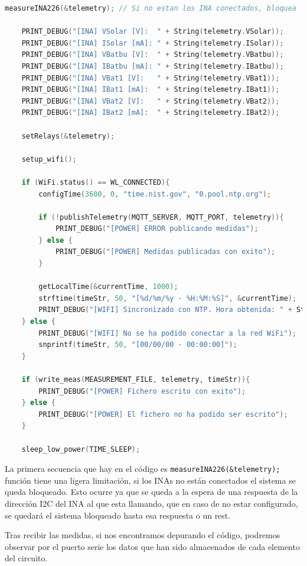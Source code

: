 \begin{lstlisting}[captionpos=b, caption={Codigo de la funcion loop}, language=c++]
    measureINA226(&telemetry); // Si no estan los INA conectados, bloquea

    PRINT_DEBUG("[INA] VSolar [V]:  " + String(telemetry.VSolar));
    PRINT_DEBUG("[INA] ISolar [mA]: " + String(telemetry.ISolar));
    PRINT_DEBUG("[INA] VBatbu [V]:  " + String(telemetry.VBatbu));
    PRINT_DEBUG("[INA] IBatbu [mA]: " + String(telemetry.IBatbu));
    PRINT_DEBUG("[INA] VBat1 [V]:   " + String(telemetry.VBat1));
    PRINT_DEBUG("[INA] IBat1 [mA]:  " + String(telemetry.IBat1));
    PRINT_DEBUG("[INA] VBat2 [V]:   " + String(telemetry.VBat2));
    PRINT_DEBUG("[INA] IBat2 [mA]:  " + String(telemetry.IBat2));

    setRelays(&telemetry);

    setup_wifi();

    if (WiFi.status() == WL_CONNECTED){
        configTime(3600, 0, "time.nist.gov", "0.pool.ntp.org");
        
        if (!publishTelemetry(MQTT_SERVER, MQTT_PORT, telemetry)){
            PRINT_DEBUG("[POWER] ERROR publicando medidas");
        } else {
            PRINT_DEBUG("[POWER] Medidas publicadas con exito");
        }

        getLocalTime(&currentTime, 1000);
        strftime(timeStr, 50, "[%d/%m/%y - %H:%M:%S]", &currentTime);
        PRINT_DEBUG("[WIFI] Sincronizado con NTP. Hora obtenida: " + String(timeStr));
    } else {
        PRINT_DEBUG("[WIFI] No se ha podido conectar a la red WiFi");
        snprintf(timeStr, 50, "[00/00/00 - 00:00:00]");
    }

    if (write_meas(MEASUREMENT_FILE, telemetry, timeStr)){
        PRINT_DEBUG("[POWER] Fichero escrito con exito");
    } else {
        PRINT_DEBUG("[POWER] El fichero no ha podido ser escrito");
    }

    sleep_low_power(TIME_SLEEP);
\end{lstlisting}

La primera secuencia que hay en el código es \texttt{measureINA226(\&telemetry);} función tiene una ligera limitación, si los INAs no están conectados el sistema se queda bloqueado.
Esto ocurre ya que se queda a la espera de una respuesta de la dirección I2C del INA al que esta llamando, que en caso de no estar configurado, se quedará el sistema bloqueado hasta esa respuesta o un rest.

Tras recibir las medidas, si nos encontramos depurando el código, podremos observar por el puerto serie los datos que han sido almacenados de cada elemento del circuito.

